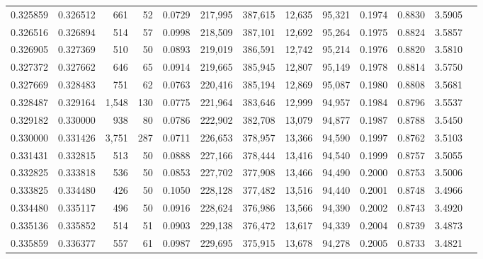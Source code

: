 \begin{tabular}{rrrrrrrrrrrrr}
0.325859 & 0.326512 &   661 &  52 &                                     0.0729 & 217,995 & 387,615 &  12,635 &  95,321 & 0.1974 & 0.8830 & 3.5905 \\
0.326516 & 0.326894 &   514 &  57 &                                     0.0998 & 218,509 & 387,101 &  12,692 &  95,264 & 0.1975 & 0.8824 & 3.5857 \\
0.326905 & 0.327369 &   510 &  50 &                                     0.0893 & 219,019 & 386,591 &  12,742 &  95,214 & 0.1976 & 0.8820 & 3.5810 \\
0.327372 & 0.327662 &   646 &  65 &                                     0.0914 & 219,665 & 385,945 &  12,807 &  95,149 & 0.1978 & 0.8814 & 3.5750 \\
0.327669 & 0.328483 &   751 &  62 &                                     0.0763 & 220,416 & 385,194 &  12,869 &  95,087 & 0.1980 & 0.8808 & 3.5681 \\
0.328487 & 0.329164 & 1,548 & 130 &                                     0.0775 & 221,964 & 383,646 &  12,999 &  94,957 & 0.1984 & 0.8796 & 3.5537 \\
0.329182 & 0.330000 &   938 &  80 &                                     0.0786 & 222,902 & 382,708 &  13,079 &  94,877 & 0.1987 & 0.8788 & 3.5450 \\
0.330000 & 0.331426 & 3,751 & 287 &                                     0.0711 & 226,653 & 378,957 &  13,366 &  94,590 & 0.1997 & 0.8762 & 3.5103 \\
0.331431 & 0.332815 &   513 &  50 &                                     0.0888 & 227,166 & 378,444 &  13,416 &  94,540 & 0.1999 & 0.8757 & 3.5055 \\
0.332825 & 0.333818 &   536 &  50 &                                     0.0853 & 227,702 & 377,908 &  13,466 &  94,490 & 0.2000 & 0.8753 & 3.5006 \\
0.333825 & 0.334480 &   426 &  50 &                                     0.1050 & 228,128 & 377,482 &  13,516 &  94,440 & 0.2001 & 0.8748 & 3.4966 \\
0.334480 & 0.335117 &   496 &  50 &                                     0.0916 & 228,624 & 376,986 &  13,566 &  94,390 & 0.2002 & 0.8743 & 3.4920 \\
0.335136 & 0.335852 &   514 &  51 &                                     0.0903 & 229,138 & 376,472 &  13,617 &  94,339 & 0.2004 & 0.8739 & 3.4873 \\
0.335859 & 0.336377 &   557 &  61 &                                     0.0987 & 229,695 & 375,915 &  13,678 &  94,278 & 0.2005 & 0.8733 & 3.4821 \\

\end{tabular}
